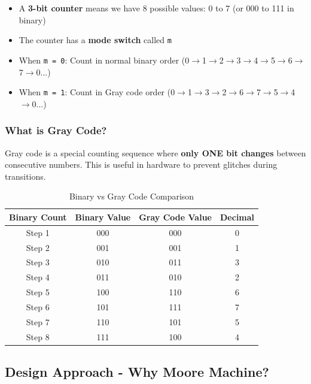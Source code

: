 \documentclass[12pt,a4paper]{article}
\begin{document}
\begin{itemize}
    \item A \textbf{3-bit counter} means we have 8 possible values: 0 to 7 (or 000 to 111 in binary)
    \item The counter has a \textbf{mode switch} called \texttt{m}
    \item When \texttt{m = 0}: Count in normal binary order (0$\rightarrow$1$\rightarrow$2$\rightarrow$3$\rightarrow$4$\rightarrow$5$\rightarrow$6$\rightarrow$7$\rightarrow$0...)
    \item When \texttt{m = 1}: Count in Gray code order (0$\rightarrow$1$\rightarrow$3$\rightarrow$2$\rightarrow$6$\rightarrow$7$\rightarrow$5$\rightarrow$4$\rightarrow$0...)
\end{itemize}

\subsubsection{What is Gray Code?}

Gray code is a special counting sequence where \textbf{only ONE bit changes} between consecutive numbers. This is useful in hardware to prevent glitches during transitions.

\begin{table}[H]
    \centering
    \begin{tabular}{|c|c|c|c|}
        \hline
        \textbf{Binary Count} & \textbf{Binary Value} & \textbf{Gray Code Value} & \textbf{Decimal} \\
        \hline
        Step 1 & 000 & 000 & 0 \\
        Step 2 & 001 & 001 & 1 \\
        Step 3 & 010 & 011 & 3 \\
        Step 4 & 011 & 010 & 2 \\
        Step 5 & 100 & 110 & 6 \\
        Step 6 & 101 & 111 & 7 \\
        Step 7 & 110 & 101 & 5 \\
        Step 8 & 111 & 100 & 4 \\
        \hline
    \end{tabular}
    \caption{Binary vs Gray Code Comparison}
\end{table}

\subsection{Design Approach - Why Moore Machine?}
\end{document}
